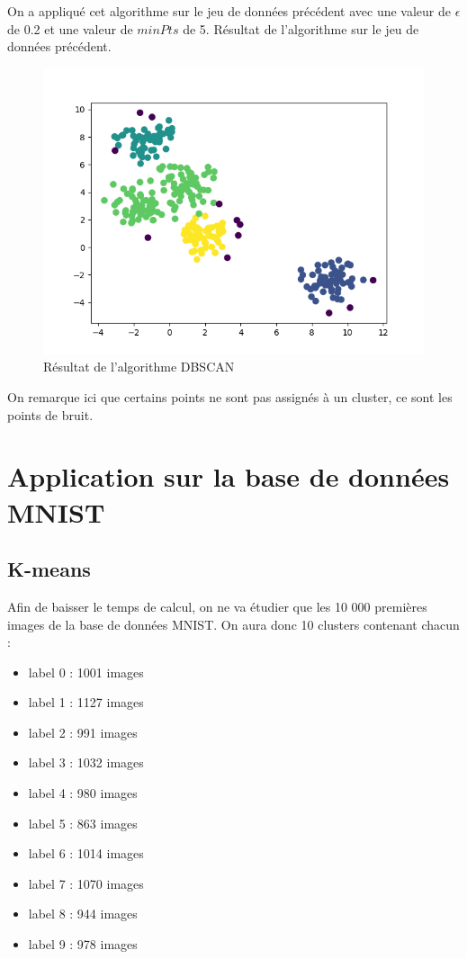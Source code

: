 \documentclass[french,a4paper,18pt]{article}
\begin{document}
On a appliqué cet algorithme sur le jeu de données précédent avec une valeur de $\epsilon$ de 0.2 et une valeur de $minPts$ de 5.
Résultat de l'algorithme sur le jeu de données précédent.
\begin{figure}[h!]
    \centering
    \includegraphics[scale=0.5]{images/short_simulation_dbscan.png}
    \caption{Résultat de l'algorithme DBSCAN}\label{fig:short_simulation_dbscan}
\end{figure}

On remarque ici que certains points ne sont pas assignés à un cluster, ce sont les points de bruit.

\section{Application sur la base de données MNIST}
\subsection{K-means}
Afin de baisser le temps de calcul, on ne va étudier que les 10 000 premières images de la base de données MNIST.
On aura donc 10 clusters contenant chacun : 
\begin{itemize}
    \item label 0 : 1001 images
    \item label 1 : 1127 images
    \item label 2 : 991 images
    \item label 3 : 1032 images
    \item label 4 : 980 images
    \item label 5 : 863 images
    \item label 6 : 1014 images
    \item label 7 : 1070 images
    \item label 8 : 944 images
    \item label 9 : 978 images
\end{itemize}
\end{document}
